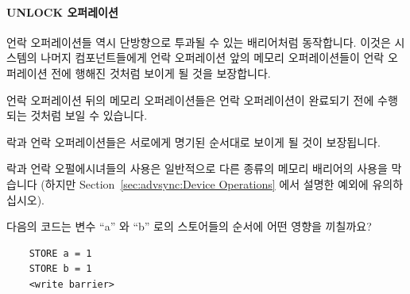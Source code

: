\begin{enumerate}
\paragraph{UNLOCK 오퍼레이션}

언락 오퍼레이션들 역시 단방향으로 투과될 수 있는 배리어처럼 동작합니다.
이것은 시스템의 나머지 컴포넌트들에게 언락 오퍼레이션 앞의 메모리
오퍼레이션들이 언락 오퍼레이션 전에 행해진 것처럼 보이게 될 것을 보장합니다.

언락 오퍼레이션 뒤의 메모리 오퍼레이션들은 언락 오퍼레이션이 완료되기 전에
수행되는 것처럼 보일 수 있습니다.

락과 언락 오퍼레이션들은 서로에게 명기된 순서대로 보이게 될 것이 보장됩니다.

락과 언락 오펄에시녀들의 사용은 일반적으로 다른 종류의 메모리 배리어의 사용을
막습니다 (하지만 Section~\ref{sec:advsync:Device Operations} 에서 설명한 예외에
유의하십시오).

\QuickQuiz{}
	다음의 코드는 변수 ``a'' 와 ``b'' 로의 스토어들의 순서에 어떤 영향을
	끼칠까요? \\

	\vspace{5pt}
	\begin{minipage}[t]{\columnwidth}
	\small
	\begin{verbatim}
	STORE a = 1
	STORE b = 1
	<write barrier>
	\end{verbatim}
	\end{minipage}
\end{enumerate}
